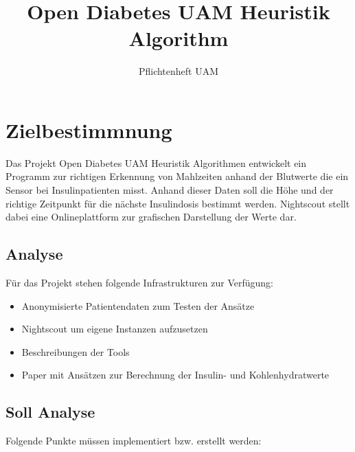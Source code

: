 \documentclass[accentcolor=tud0b,12pt,paper=a4]{tudreport}
\title{Open Diabetes UAM Heuristik Algorithm}
\subtitle{Pflichtenheft UAM}
\begin{document}
	\maketitle
	\tableofcontents 
	\newpage
	\chapter{Zielbestimmnung}
	
	Das Projekt Open Diabetes UAM Heuristik Algorithmen entwickelt ein Programm zur richtigen Erkennung von Mahlzeiten anhand der Blutwerte die ein Sensor bei Insulinpatienten misst. Anhand dieser Daten soll die Höhe und der richtige Zeitpunkt für die nächste Insulindosis bestimmt werden. Nightscout stellt dabei eine Onlineplattform zur grafischen Darstellung der Werte dar. 
	\section{Analyse}

Für das Projekt stehen folgende Infrastrukturen zur Verfügung: 
\begin{itemize}
	\item Anonymisierte Patientendaten zum Testen der Ansätze
	\item Nightscout um eigene Instanzen aufzusetzen 
	\item Beschreibungen der Tools
	\item Paper mit Ansätzen zur Berechnung der Insulin- und Kohlenhydratwerte
\end{itemize}
	
	\section{Soll Analyse}

Folgende Punkte müssen implementiert bzw. erstellt werden:
\end{document}
